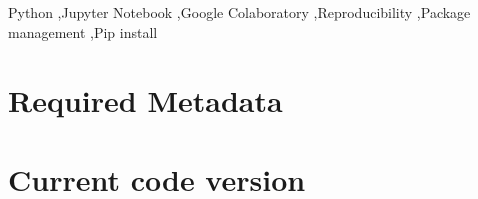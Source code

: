 \documentclass[preprint,12pt, a4paper]{elsarticle}
\begin{document}
\begin{frontmatter}
\begin{abstract}








\end{abstract}


\begin{keyword}
Python \sep Jupyter Notebook \sep Google Colaboratory \sep Reproducibility \sep Package management \sep Pip install
\end{keyword}

\end{frontmatter}


\section*{Required Metadata}

\section*{Current code version}
\end{document}
